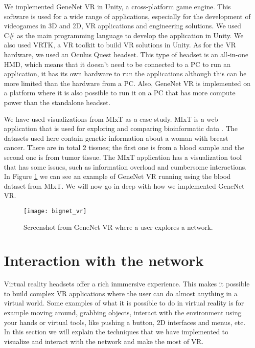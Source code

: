 We implemented GeneNet VR in Unity, a cross-platform game engine. This software is used for a wide range of applications, especially for the development of videogames in 3D and 2D, VR applications and engineering solutions. We used C\# as the main programming language to develop the application in Unity. We also used VRTK, a VR toolkit to build VR solutions in Unity. As for the VR hardware, we used an Oculus Quest headset. This type of headset is an all-in-one HMD, which means that it doesn't need to be connected to a PC to run an application, it has its own hardware to run the applications although this can be more limited than the hardware from a PC. Also, GeneNet VR is implemented on a platform where it is also possible to run it on a PC that has more compute power than the standalone headset.

We have used visualizations from MIxT as a case study. MIxT is a web application that is used for exploring and comparing bioinformatic data  \cite{fjukstad_dumeaux_olsen_lund_hallett_bongo_2017}  \cite{dumeaux_fjukstad_interactions_tumor_blood}. The datasets used here contain genetic information about a woman with breast cancer. There are in total 2 tissues; the first one is from a blood sample and the second one is from tumor tissue. The MIxT application has a visualization tool that has some issues, such as information overload and cumbersome interactions. In Figure \ref{fig:bignet_vr} we can see an example of GeneNet VR running using the blood dataset from MIxT. We will now go in deep with how we implemented GeneNet VR.

\begin{figure}[h!]
    \setlength{\tempheight}{15ex}
    \centering
    \texttt{[image: bignet\_vr]}
    \caption{Screenshot from GeneNet VR where a user explores a network.}
    \label{fig:bignet_vr}
\end{figure}

\section{Interaction with the network}
Virtual reality headsets offer a rich inmmersive experience. This makes it possible to build complex VR applications where the user can do almost anything in a virtual world. Some examples of what it is possible to do in virtual reality is for example moving around, grabbing objects, interact with the environment using your hands or virtual tools, like pushing a button, 2D interfaces and menus, etc. In this section we will explain the techniques that we have implemented to visualize and interact with the network and make the most of VR.

